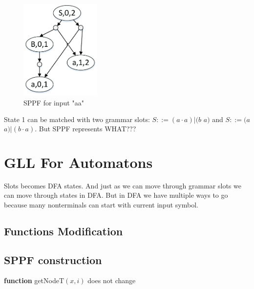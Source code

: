 \documentclass[runningheads,a4paper]{llncs}
\begin{document}
\begin{figure}
    \centering
    \includegraphics[width=4cm]{pictures/SPPFforG0.pdf}
    \caption{SPPF for input "aa"}
    \label{fig:SPPF}
\end{figure}


State 1 can be matched with two grammar slots: $S ::= (a \cdot a)|(b$ $a)$ and $S ::= (a$ $a)|(b \cdot a)$. But 
SPPF represents WHAT???


\section{GLL For Automatons}%
Slots becomes DFA states. And just as we can move through grammar slots we can move through states 
in DFA. But in DFA we have multiple ways to go because many nonterminals can start with current input symbol. 


\subsection{Functions Modification}%





\subsection{SPPF construction}
\textbf{function} getNodeT$(x,i)$ does not change
\end{document}
